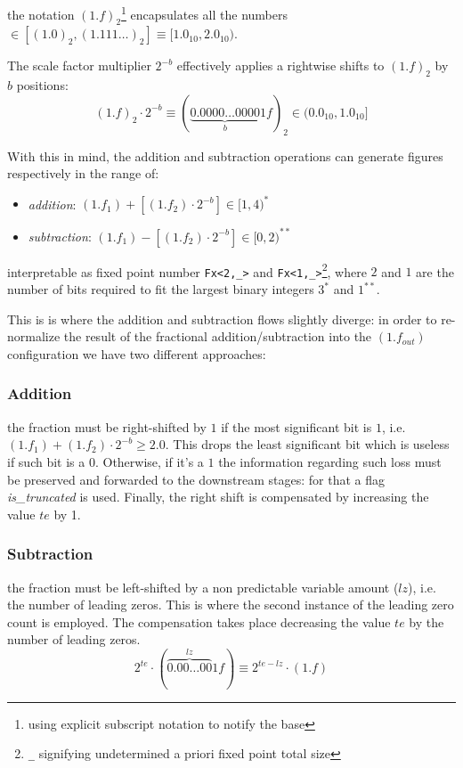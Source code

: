 the notation $(1.f)_2$\footnote{using explicit subscript notation to notify the base} encapsulates all the numbers $\in [(1.0)_2, (1.111\dots)_2 ] \equiv [1.0_{10},  2.0_{10})$.

The scale factor multiplier $2^{-b}$ effectively applies a rightwise shifts to $(1.f)_2$ by $b$ positions:
$$
(1.f)_2 \cdot 2^{-b} \equiv (\underbrace{0.0000\dots0000}_{b}1f)_2 \in (0.0_{10}, 1.0_{10}]
$$



With this in mind, the addition and subtraction operations can generate figures respectively in the range of:
\begin{itemize}
    \item \textit{addition}: $(1.f_1) + [(1.f_2) \cdot 2^{-b}] \in [1, 4)^{*}$
    \item \textit{subtraction}: $(1.f_1) - [(1.f_2) \cdot 2^{-b}] \in [0, 2)^{**}$
\end{itemize}
interpretable as fixed point number \texttt{Fx<2,\_>} and \texttt{Fx<1,\_>}\footnote{\texttt{\_} signifying undetermined a priori fixed point total size}, where $2$ and $1$ are the number of bits required to fit the largest binary integers $3^{*}$ and $1^{**}$.

This is is where the addition and subtraction flows slightly diverge: in order to re-normalize the result of the fractional addition/subtraction into the $(1.f_{out})$ configuration we have two different approaches:

\begin{multicols}{2}
    \subsubsection*{Addition}
    the fraction must be right-shifted by $1$ if the most significant bit is $1$, i.e. $(1.f_1) + (1.f_2) \cdot 2^{-b} \ge 2.0$. 
    This drops the least significant bit which is useless if such bit is a $0$. Otherwise, if it's a $1$ the information regarding such loss must be preserved and forwarded to the downstream stages: for that a flag \textit{is\_truncated} is used. Finally, the right shift is compensated by increasing the value $te$ by 1.
\columnbreak
    \subsubsection*{Subtraction}
    the fraction must be left-shifted by a non predictable variable amount ($lz$), i.e. the number of leading zeros. This is where the second instance of the leading zero count is employed. The compensation takes place decreasing the value $te$ by the number of leading zeros.
    $$
    2^{te} \cdot (\overbrace{0.00\dots00}^{lz}1f) \equiv 2^{te - lz} \cdot (1.f)
    $$
\end{multicols}


